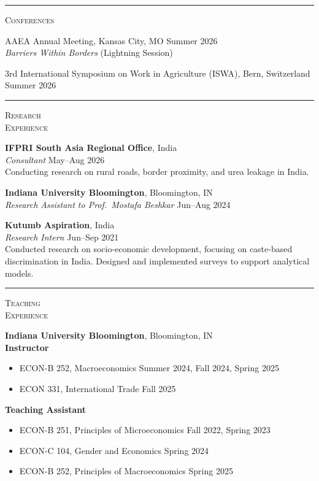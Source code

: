 \documentclass[10pt, a4paper]{article}
\newlength{\lblwidth}
\newlength{\cntwidth}
\newenvironment{cvsec}[1]{%
  \vspace{8pt}%
  \noindent%
  \begin{minipage}[t]{\lblwidth}%
    \raggedright\small\textsc{#1}%
  \end{minipage}%
  \hspace{6pt}%
  \begin{minipage}[t]{\cntwidth}%
    \raggedright%
}{%
  \end{minipage}\par\vspace{6pt}%
}
\begin{document}
\noindent\rule{\textwidth}{0.2pt}

\begin{cvsec}{Conferences}
AAEA Annual Meeting, Kansas City, MO \hfill Summer 2026 \\
\hspace{1em} \textit{Barriers Within Borders} 
(Lightning Session)

\bigskip
3rd International Symposium on Work in Agriculture (ISWA), Bern, Switzerland \hfill Summer 2026 
\end{cvsec}

\noindent\rule{\textwidth}{0.2pt}

\begin{cvsec}{Research\\Experience}
\textbf{IFPRI South Asia Regional Office}, India \\
\textit{Consultant} \hfill May--Aug 2026 \\
Conducting research on rural roads, border proximity, and urea leakage in India.


\bigskip
\textbf{Indiana University Bloomington}, Bloomington, IN \\
\textit{Research Assistant to Prof.\ Mostafa Beshkar} \hfill Jun--Aug 2024

\bigskip
\textbf{Kutumb Aspiration}, India \\
\textit{Research Intern} \hfill Jun--Sep 2021 \\
Conducted research on socio-economic development, focusing on caste-based discrimination in India. Designed and implemented surveys to support analytical models.
\end{cvsec}

\noindent\rule{\textwidth}{0.2pt}

\begin{cvsec}{Teaching\\Experience}
\textbf{Indiana University Bloomington}, Bloomington, IN \\[3pt]
\textbf{Instructor}
\begin{itemize}
  \item ECON-B 252, Macroeconomics \hfill Summer 2024, Fall 2024, Spring 2025
  \item ECON 331, International Trade \hfill Fall 2025
\end{itemize}

\medskip
\textbf{Teaching Assistant}
\begin{itemize}
  \item ECON-B 251, Principles of Microeconomics \hfill Fall 2022, Spring 2023
  \item ECON-C 104, Gender and Economics \hfill Spring 2024
  \item ECON-B 252, Principles of Macroeconomics \hfill Spring 2025
\end{itemize}
\end{cvsec}
\end{document}
